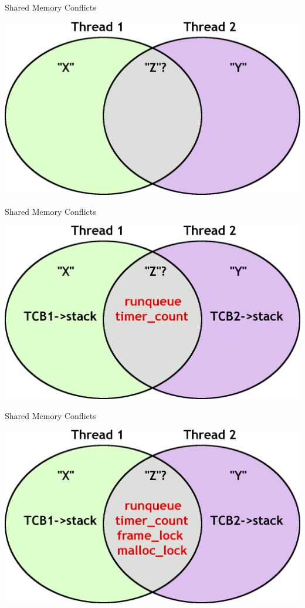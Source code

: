 \documentclass[xcolor=dvipsnames]{beamer}
\begin{document}
\begin{frame}{Shared Memory Conflicts} %
	\begin{center}
	\includegraphics[width=\textwidth]{shm-conflict0.png}
	\end{center}
\end{frame}
\begin{frame}{Shared Memory Conflicts}
	\begin{center}
	\includegraphics[width=\textwidth]{shm-conflict1.png}
	\end{center}
\end{frame}
\begin{frame}{Shared Memory Conflicts}
	\begin{center}
	\includegraphics[width=\textwidth]{shm-conflict2.png}
	\end{center}
\end{frame}
\end{document}
